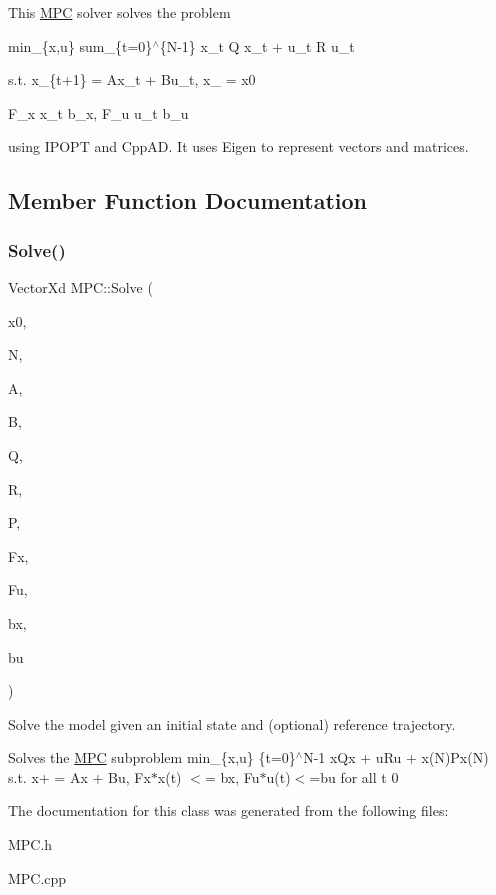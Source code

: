 This \mbox{\hyperlink{classMPC}{M\+PC}} solver solves the problem

min\+\_\+\{x,u\} sum\+\_\+\{t=0\}$^\wedge$\{N-\/1\} x\+\_\+t\textquotesingle{} Q x\+\_\+t + u\+\_\+t\textquotesingle{} R u\+\_\+t

s.\+t. x\+\_\+\{t+1\} = Ax\+\_\+t + Bu\+\_\+t, x\+\_ = x0 \begin{DoxyVerb} F_x x_t \leq b_x, F_u u_t \leq b_u
\end{DoxyVerb}


using I\+P\+O\+PT and Cpp\+AD. It uses Eigen to represent vectors and matrices. 

\subsection{Member Function Documentation}
\mbox{\label{classMPC_ab66c070c8bf92ee7d16a1ea521f6ec2f}} 
\subsubsection{\texorpdfstring{Solve()}{Solve()}}
{\footnotesize\ttfamily Vector\+Xd M\+P\+C\+::\+Solve (\begin{DoxyParamCaption}\item[{const Vector\+Xd \&}]{x0,  }\item[{int}]{N,  }\item[{const Matrix\+Xd \&}]{A,  }\item[{const Matrix\+Xd \&}]{B,  }\item[{const Matrix\+Xd \&}]{Q,  }\item[{const Matrix\+Xd \&}]{R,  }\item[{const Matrix\+Xd \&}]{P,  }\item[{const Matrix\+Xd \&}]{Fx,  }\item[{const Matrix\+Xd \&}]{Fu,  }\item[{const Vector\+Xd \&}]{bx,  }\item[{const Vector\+Xd \&}]{bu }\end{DoxyParamCaption})}



Solve the model given an initial state and (optional) reference trajectory. 

Solves the \mbox{\hyperlink{classMPC}{M\+PC}} subproblem min\+\_\+\{x,u\} \{t=0\}$^\wedge$\+N-\/1 x\textquotesingle{}Qx + u\textquotesingle{}Ru + x(\+N)\textquotesingle{}Px(\+N) s.\+t. x+ = Ax + Bu, Fx$\ast$x(t) $<$= bx, Fu$\ast$u(t)$<$=bu for all t 0 

The documentation for this class was generated from the following files\+:\begin{DoxyCompactItemize}
\item 
M\+P\+C.\+h\item 
M\+P\+C.\+cpp\end{DoxyCompactItemize}
